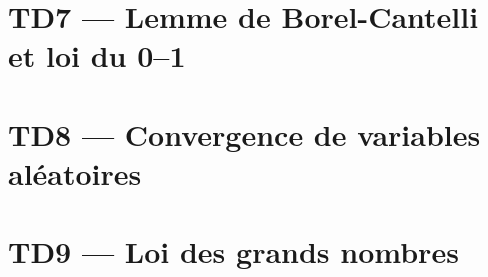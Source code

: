 \documentclass[french,a4paper,10pt]{article}
\begin{document}
    \newpage
    \section*{TD7 --- Lemme de Borel-Cantelli et loi du 0--1}\label{sec:TD7}
    \setcounter{section}{7}
    \setcounter{tdcounter}{0}
    

    \newpage
    \section*{TD8 --- Convergence de variables aléatoires}\label{sec:TD8}
    \setcounter{section}{8}
    \setcounter{tdcounter}{0}
    

    \newpage
    \section*{TD9 --- Loi des grands nombres}\label{sec:TD9}
    \setcounter{section}{9}
    \setcounter{tdcounter}{0}
    
\end{document}
